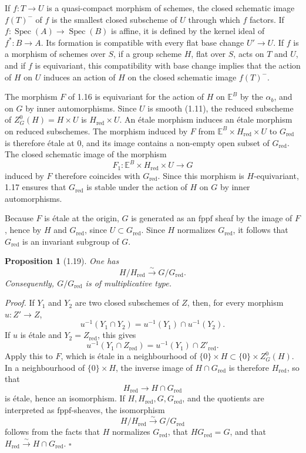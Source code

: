 \documentclass[10pt]{article}
\newcommand{\Spec}{\operatorname{Spec}}
\newcommand{\red}{\mathrm{red}}
\newcommand{\fppf}{\mathrm{fppf}}
\theoremstyle{deligne}
\newtheorem*{proposition*}{Proposition}
\newenvironment{proofdel}{\textit{Proof.}}{\hfill$\square$}
\newcommand{\heading}[1]{\vspace{0.7em}\noindent{\bfseries #1}\quad}
\begin{document}
\heading{1.17.} If \(f:T\to U\) is a quasi-compact morphism of schemes, the closed schematic image \(f(T)^-\) of \(f\) is the smallest closed subscheme of \(U\) through which \(f\) factors. If \(f:\Spec(A)\to\Spec(B)\) is affine, it is defined by the kernel ideal of \(f^*:B\to A\). Its formation is compatible with every flat base change \(U'\to U\). If \(f\) is a morphism of schemes over \(S\), if a group scheme \(H\), flat over \(S\), acts on \(T\) and \(U\), and if \(f\) is equivariant, this compatibility with base change implies that the action of \(H\) on \(U\) induces an action of \(H\) on the closed schematic image \(f(T)^-\).

\heading{1.18. Proof of the invariance of \(G_{\red}\) in \(G\).} The morphism \(F\) of 1.16 is equivariant for the action of \(H\) on \(\mathbb E^B\) by the \(\alpha_b\), and on \(G\) by inner automorphisms. Since \(U\) is smooth (1.11), the reduced subscheme of \(Z^0_G(H)=H\times U\) is \(H_{\red}\times U\). An étale morphism induces an étale morphism on reduced subschemes. The morphism induced by \(F\) from \(\mathbb E^B\times H_{\red}\times U\) to \(G_{\red}\) is therefore étale at \(0\), and its image contains a non-empty open subset of \(G_{\red}\). The closed schematic image of the morphism
\[
  F_1:\mathbb E^B\times H_{\red}\times U\longrightarrow G
\]
induced by \(F\) therefore coincides with \(G_{\red}\). Since this morphism is \(H\)-equivariant, 1.17 ensures that \(G_{\red}\) is stable under the action of \(H\) on \(G\) by inner automorphisms.

Because \(F\) is étale at the origin, \(G\) is generated as an \(\fppf\) sheaf by the image of \(F\), hence by \(H\) and \(G_{\red}\), since \(U\subset G_{\red}\). Since \(H\) normalizes \(G_{\red}\), it follows that \(G_{\red}\) is an invariant subgroup of \(G\).

\begin{proposition*}[1.19]
One has
\[
  H/H_{\red}\overset{\sim}{\longrightarrow}G/G_{\red}.
\]
Consequently, \(G/G_{\red}\) is of multiplicative type.
\end{proposition*}

\begin{proofdel}
If \(Y_1\) and \(Y_2\) are two closed subschemes of \(Z\), then, for every morphism \(u:Z'\to Z\),
\[
u^{-1}(Y_1\cap Y_2)=u^{-1}(Y_1)\cap u^{-1}(Y_2).
\]
If \(u\) is étale and \(Y_2=Z_{\red}\), this gives
\[
u^{-1}(Y_1\cap Z_{\red})=u^{-1}(Y_1)\cap Z'_{\red}.
\]
Apply this to \(F\), which is étale in a neighbourhood of \(\{0\}\times H\subset \{0\}\times Z^0_G(H)\). In a neighbourhood of \(\{0\}\times H\), the inverse image of \(H\cap G_{\red}\) is therefore \(H_{\red}\), so that
\[
H_{\red}\longrightarrow H\cap G_{\red}
\]
is étale, hence an isomorphism. If \(H,H_{\red},G,G_{\red}\), and the quotients are interpreted as \(\fppf\)-sheaves, the isomorphism
\[
H/H_{\red}\overset{\sim}{\longrightarrow}G/G_{\red}
\]
follows from the facts that \(H\) normalizes \(G_{\red}\), that \(HG_{\red}=G\), and that \(H_{\red}\overset{\sim}{\longrightarrow}H\cap G_{\red}\).
\end{proofdel}
\end{document}
